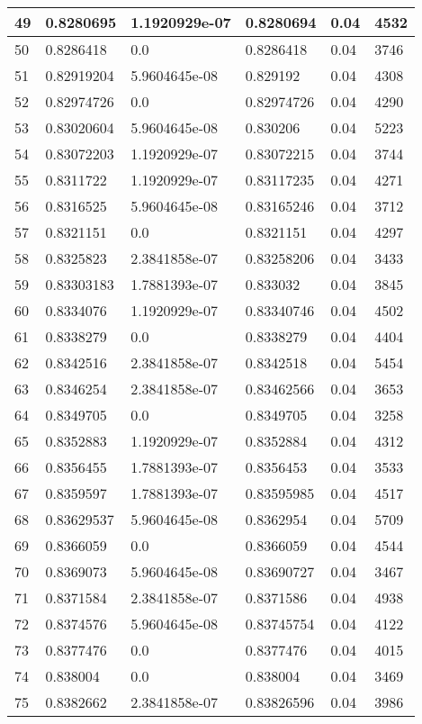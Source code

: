 \begin{longtable}{|l|l|l|l|l|l|}
49 & 0.8280695 & 1.1920929e-07 & 0.8280694 & 0.04 & 4532 \\ \hline 
50 & 0.8286418 & 0.0 & 0.8286418 & 0.04 & 3746 \\ \hline 
51 & 0.82919204 & 5.9604645e-08 & 0.829192 & 0.04 & 4308 \\ \hline 
52 & 0.82974726 & 0.0 & 0.82974726 & 0.04 & 4290 \\ \hline 
53 & 0.83020604 & 5.9604645e-08 & 0.830206 & 0.04 & 5223 \\ \hline 
54 & 0.83072203 & 1.1920929e-07 & 0.83072215 & 0.04 & 3744 \\ \hline 
55 & 0.8311722 & 1.1920929e-07 & 0.83117235 & 0.04 & 4271 \\ \hline 
56 & 0.8316525 & 5.9604645e-08 & 0.83165246 & 0.04 & 3712 \\ \hline 
57 & 0.8321151 & 0.0 & 0.8321151 & 0.04 & 4297 \\ \hline 
58 & 0.8325823 & 2.3841858e-07 & 0.83258206 & 0.04 & 3433 \\ \hline 
59 & 0.83303183 & 1.7881393e-07 & 0.833032 & 0.04 & 3845 \\ \hline 
60 & 0.8334076 & 1.1920929e-07 & 0.83340746 & 0.04 & 4502 \\ \hline 
61 & 0.8338279 & 0.0 & 0.8338279 & 0.04 & 4404 \\ \hline 
62 & 0.8342516 & 2.3841858e-07 & 0.8342518 & 0.04 & 5454 \\ \hline 
63 & 0.8346254 & 2.3841858e-07 & 0.83462566 & 0.04 & 3653 \\ \hline 
64 & 0.8349705 & 0.0 & 0.8349705 & 0.04 & 3258 \\ \hline 
65 & 0.8352883 & 1.1920929e-07 & 0.8352884 & 0.04 & 4312 \\ \hline 
66 & 0.8356455 & 1.7881393e-07 & 0.8356453 & 0.04 & 3533 \\ \hline 
67 & 0.8359597 & 1.7881393e-07 & 0.83595985 & 0.04 & 4517 \\ \hline 
68 & 0.83629537 & 5.9604645e-08 & 0.8362954 & 0.04 & 5709 \\ \hline 
69 & 0.8366059 & 0.0 & 0.8366059 & 0.04 & 4544 \\ \hline 
70 & 0.8369073 & 5.9604645e-08 & 0.83690727 & 0.04 & 3467 \\ \hline 
71 & 0.8371584 & 2.3841858e-07 & 0.8371586 & 0.04 & 4938 \\ \hline 
72 & 0.8374576 & 5.9604645e-08 & 0.83745754 & 0.04 & 4122 \\ \hline 
73 & 0.8377476 & 0.0 & 0.8377476 & 0.04 & 4015 \\ \hline 
74 & 0.838004 & 0.0 & 0.838004 & 0.04 & 3469 \\ \hline 
75 & 0.8382662 & 2.3841858e-07 & 0.83826596 & 0.04 & 3986 \\ \hline 
\end{longtable}